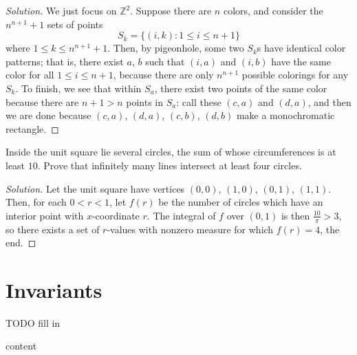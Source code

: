 \documentclass[11pt]{scrartcl}
\providecommand{\ZZ}{\mathbb Z}
\newenvironment{soln}{\begin{proof}[Solution]}{\end{proof}}
\begin{document}
\begin{soln}
	We just focus on $\ZZ^2$. Suppose there are $n$ colors, and
	consider the $n^{n+1} + 1$ sets of points
	\[S_k = \{(i, k) : 1\le i\le n + 1\}\]
	where $1\le k\le n^{n+1}+1$.
	Then, by pigeonhole, some two $S_k$s have identical color patterns;
	that is, there exist $a$, $b$ such that
	$(i, a)$ and $(i, b)$ have the same color for all $1\le i\le n+1$,
	because there are only $n^{n+1}$ possible colorings for any $S_k$.
	To finish, we see that within $S_a$,
	there exist two points of the same color
	because there are $n+1 > n$ points in $S_a$:
	call these  $(c, a)$ and $(d, a)$, and then
	we are done because $(c, a)$, $(d, a)$, $(c, b)$, $(d, b)$
	make a monochromatic rectangle.
\end{soln}

\begin{problem}
	Inside the unit square lie several circles, the sum of whose circumferences
	is at least $10$. Prove that infinitely many lines intersect
	at least four circles.
\end{problem}

\begin{soln}
	Let the unit square have vertices $(0,0)$, $(1,0)$, $(0,1)$, $(1,1)$.
	Then, for each $0 < r < 1$, let $f(r)$ be the number of circles
	which have an interior point with $x$-coordinate $r$.
	The integral of $f$ over $(0,1)$ is then $\frac{10}{\pi} > 3$,
	so there exists a set of $r$-values with nonzero measure
	for which $f(r) = 4$, the end.
\end{soln}

\pagebreak
\section{Invariants}

\begin{problem}
	TODO fill in
\end{problem}

\begin{problem}
	content
\end{problem}
\end{document}
